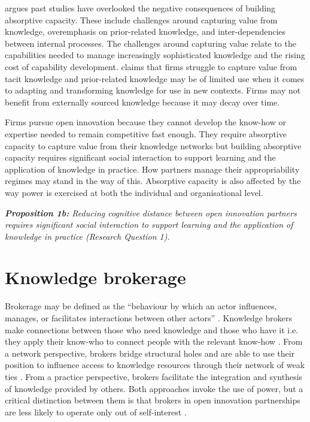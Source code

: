 \citet {lichtenthaler2016absorptive} argues past studies have overlooked the negative consequences of building absorptive capacity. These include challenges around capturing value from knowledge, overemphasis on prior-related knowledge, and inter-dependencies between internal processes. The challenges around capturing value relate to the capabilities needed to manage increasingly sophisticated knowledge and the rising cost of capability development. \citet{lichtenthaler2016absorptive} claims that firms struggle to capture value from tacit knowledge and prior-related knowledge may be of limited use when it comes to adapting and transforming knowledge for use in new contexts. Firms may not benefit from externally sourced knowledge because it may decay over time. \medskip

Firms pursue open innovation because they cannot develop the know-how or expertise needed to remain competitive fast enough. They require absorptive capacity to capture value from their knowledge networks but building absorptive capacity requires significant social interaction to support learning and the application of knowledge in practice. How partners manage their appropriability regimes may stand in the way of this. Absorptive capacity is also affected by the way power is exercised at both the individual and organisational level. \bigskip

\begin{tcolorbox}
\textit{\textbf{Proposition 1b:} Reducing cognitive distance between open innovation partners  requires  significant  social  interaction  to support learning and the application of knowledge in practice (Research Question 1).}
\end{tcolorbox}

\section{Knowledge brokerage}

Brokerage may be defined as the \enquote{behaviour by which an actor influences, manages, or facilitates interactions between other actors} \citep{obstfeld2014brokerage}. Knowledge brokers make connections between those who need knowledge and those who have it i.e. they apply their know-who to connect people with the relevant know-how \citep{davenport1998working}. From a network perspective, brokers bridge structural holes and are able to use their position to influence access to knowledge resources through their network of weak ties \citep{burt1992structural,hanneman2005introduction,davis2010agency,simpson2011network,stovel2012brokerage}. From a practice perspective, brokers facilitate the integration and synthesis of knowledge provided by others. Both approaches invoke the use of power, but a critical distinction between them is that brokers in open innovation partnerships are less likely to operate only out of self-interest \citep{lingo2010nexus,marabelli2016strategic}. \medskip

